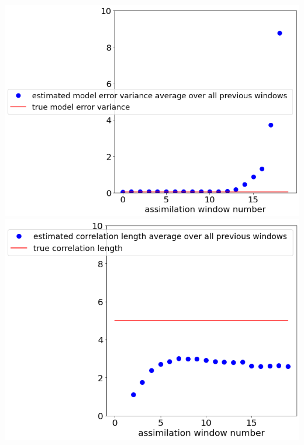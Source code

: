 \documentclass[a4paper,10pt]{article}
\numberwithin{equation}{section}
\begin{document}
\includegraphics[scale=0.4]{Ex6meanvar}\hspace{-3cm}
\includegraphics[scale=0.4]{Ex6meanlen}


\newpage
\end{document}
